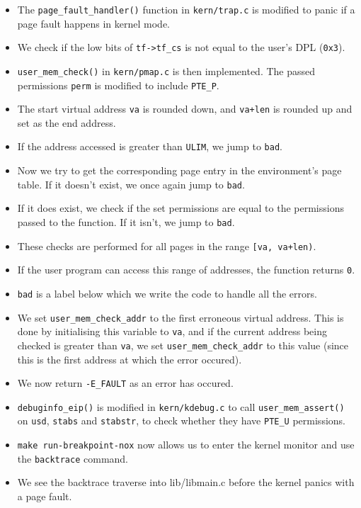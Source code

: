 \documentclass[]{article}
\begin{document}
\begin{itemize}
\itemsep1pt\parskip0pt
\item
  The \texttt{page\_fault\_handler()} function in \texttt{kern/trap.c}
  is modified to panic if a page fault happens in kernel mode.
\item
  We check if the low bits of \texttt{tf-\textgreater{}tf\_cs} is not
  equal to the user's DPL (\texttt{0x3}).
\item
  \texttt{user\_mem\_check()} in \texttt{kern/pmap.c} is then
  implemented. The passed permissions \texttt{perm} is modified to
  include \texttt{PTE\_P}.
\item
  The start virtual address \texttt{va} is rounded down, and
  \texttt{va+len} is rounded up and set as the end address.
\item
  If the address accessed is greater than \texttt{ULIM}, we jump to
  \texttt{bad}.
\item
  Now we try to get the corresponding page entry in the environment's
  page table. If it doesn't exist, we once again jump to \texttt{bad}.
\item
  If it does exist, we check if the set permissions are equal to the
  permissions passed to the function. If it isn't, we jump to
  \texttt{bad}.
\item
  These checks are performed for all pages in the range
  \texttt{{[}va, va+len)}.
\item
  If the user program can access this range of addresses, the function
  returns \texttt{0}.
\item
  \texttt{bad} is a label below which we write the code to handle all
  the errors.
\item
  We set \texttt{user\_mem\_check\_addr} to the first erroneous virtual
  address. This is done by initialising this variable to \texttt{va},
  and if the current address being checked is greater than \texttt{va},
  we set \texttt{user\_mem\_check\_addr} to this value (since this is
  the first address at which the error occured).
\item
  We now return \texttt{-E\_FAULT} as an error has occured.
\item
  \texttt{debuginfo\_eip()} is modified in \texttt{kern/kdebug.c} to
  call \texttt{user\_mem\_assert()} on \texttt{usd}, \texttt{stabs} and
  \texttt{stabstr}, to check whether they have \texttt{PTE\_U}
  permissions.
\item
  \texttt{make run-breakpoint-nox} now allows us to enter the kernel
  monitor and use the \texttt{backtrace} command.
\item
  We see the backtrace traverse into lib/libmain.c before the kernel
  panics with a page fault.
\end{itemize}
\end{document}
